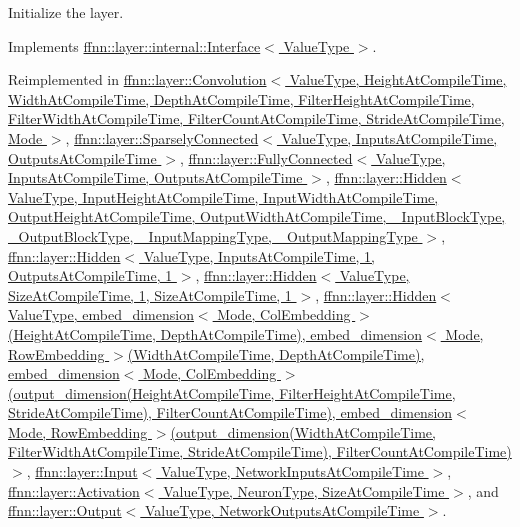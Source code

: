 Initialize the layer. 



Implements \hyperlink{classffnn_1_1layer_1_1internal_1_1_interface_a4159d9d163a0bd5287cc02c91b5baba8}{ffnn\-::layer\-::internal\-::\-Interface$<$ Value\-Type $>$}.



Reimplemented in \hyperlink{classffnn_1_1layer_1_1_convolution_ad438bd0584804863bd064a493e2892a1}{ffnn\-::layer\-::\-Convolution$<$ Value\-Type, Height\-At\-Compile\-Time, Width\-At\-Compile\-Time, Depth\-At\-Compile\-Time, Filter\-Height\-At\-Compile\-Time, Filter\-Width\-At\-Compile\-Time, Filter\-Count\-At\-Compile\-Time, Stride\-At\-Compile\-Time, Mode $>$}, \hyperlink{classffnn_1_1layer_1_1_sparsely_connected_abb2966b5e7813c43ae2ea5448188a9fb}{ffnn\-::layer\-::\-Sparsely\-Connected$<$ Value\-Type, Inputs\-At\-Compile\-Time, Outputs\-At\-Compile\-Time $>$}, \hyperlink{classffnn_1_1layer_1_1_fully_connected_aec414194202f845b866b0e8b2a51235c}{ffnn\-::layer\-::\-Fully\-Connected$<$ Value\-Type, Inputs\-At\-Compile\-Time, Outputs\-At\-Compile\-Time $>$}, \hyperlink{classffnn_1_1layer_1_1_hidden_a3b5458a771fcf2371376049d85afbc92}{ffnn\-::layer\-::\-Hidden$<$ Value\-Type, Input\-Height\-At\-Compile\-Time, Input\-Width\-At\-Compile\-Time, Output\-Height\-At\-Compile\-Time, Output\-Width\-At\-Compile\-Time, \-\_\-\-Input\-Block\-Type, \-\_\-\-Output\-Block\-Type, \-\_\-\-Input\-Mapping\-Type, \-\_\-\-Output\-Mapping\-Type $>$}, \hyperlink{classffnn_1_1layer_1_1_hidden_a3b5458a771fcf2371376049d85afbc92}{ffnn\-::layer\-::\-Hidden$<$ Value\-Type, Inputs\-At\-Compile\-Time, 1, Outputs\-At\-Compile\-Time, 1 $>$}, \hyperlink{classffnn_1_1layer_1_1_hidden_a3b5458a771fcf2371376049d85afbc92}{ffnn\-::layer\-::\-Hidden$<$ Value\-Type, Size\-At\-Compile\-Time, 1, Size\-At\-Compile\-Time, 1 $>$}, \hyperlink{classffnn_1_1layer_1_1_hidden_a3b5458a771fcf2371376049d85afbc92}{ffnn\-::layer\-::\-Hidden$<$ Value\-Type, embed\-\_\-dimension$<$ Mode, Col\-Embedding $>$(\-Height\-At\-Compile\-Time, Depth\-At\-Compile\-Time), embed\-\_\-dimension$<$ Mode, Row\-Embedding $>$(\-Width\-At\-Compile\-Time, Depth\-At\-Compile\-Time), embed\-\_\-dimension$<$ Mode, Col\-Embedding $>$(output\-\_\-dimension(\-Height\-At\-Compile\-Time, Filter\-Height\-At\-Compile\-Time, Stride\-At\-Compile\-Time), Filter\-Count\-At\-Compile\-Time), embed\-\_\-dimension$<$ Mode, Row\-Embedding $>$(output\-\_\-dimension(\-Width\-At\-Compile\-Time, Filter\-Width\-At\-Compile\-Time, Stride\-At\-Compile\-Time), Filter\-Count\-At\-Compile\-Time)$>$}, \hyperlink{classffnn_1_1layer_1_1_input_ac3de713973a8f67dc348a088ab6dbe1c}{ffnn\-::layer\-::\-Input$<$ Value\-Type, Network\-Inputs\-At\-Compile\-Time $>$}, \hyperlink{classffnn_1_1layer_1_1_activation_ae73ef2d36d9c5ce3c219f6a51cba3c35}{ffnn\-::layer\-::\-Activation$<$ Value\-Type, Neuron\-Type, Size\-At\-Compile\-Time $>$}, and \hyperlink{classffnn_1_1layer_1_1_output_ab9ebd05595bc6b75718191aa48e70ad2}{ffnn\-::layer\-::\-Output$<$ Value\-Type, Network\-Outputs\-At\-Compile\-Time $>$}.

